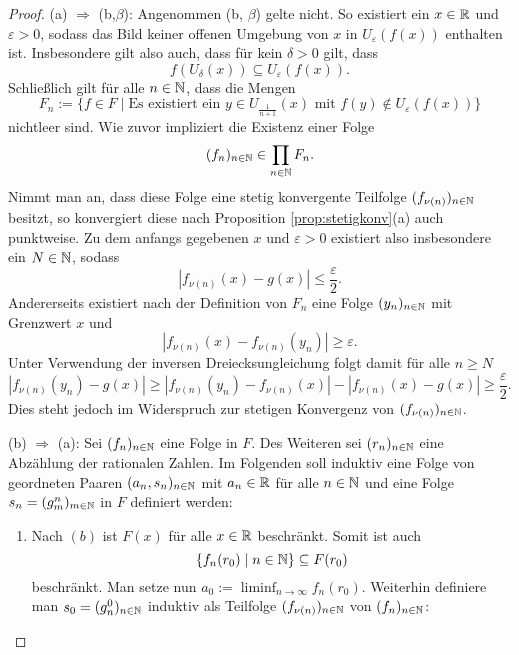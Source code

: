 \begin{proof}
  (a) $\Rightarrow$ (b,$\beta$):
  Angenommen (b, $\beta$) gelte nicht.
  So existiert ein $x \in \mathbb{R}$ und $\varepsilon > 0$, sodass das Bild keiner offenen Umgebung von $x$ in $U_\varepsilon(f(x))$ enthalten ist.
  Insbesondere gilt also auch, dass für kein $\delta > 0$ gilt, dass
  \begin{displaymath}
    f(U_\delta(x)) \subseteq U_\varepsilon(f(x)).
  \end{displaymath}
  Schließlich gilt für alle $n \in \mathbb{N}$, dass die Mengen
  \begin{displaymath}
    F_n := \{ f \in F \mid \text{Es existiert ein } y \in U_{\frac{1}{n+1}}(x) \text{ mit } f(y) \not\in U_\varepsilon(f(x)) \}
  \end{displaymath}
  nichtleer sind.
  Wie zuvor impliziert \CCR die Existenz einer Folge 
  \begin{displaymath}
    (f_n)_{n \in \mathbb{N}} \in \prod_{n \in \mathbb{N}} F_n.
  \end{displaymath}
  Nimmt man an, dass diese Folge eine stetig konvergente Teilfolge $(f_{\nu(n)})_{n \in \mathbb{N}}$ besitzt, so konvergiert diese nach Proposition \ref{prop:stetigkonv}(a) auch punktweise.
  Zu dem anfangs gegebenen $x$ und $\varepsilon > 0$ existiert also insbesondere ein $N \in \mathbb{N}$, sodass
  \begin{displaymath}
    | f_{\nu(n)}(x) - g(x) | \leq \frac{\varepsilon}{2}.
  \end{displaymath}
  Andererseits existiert nach der Definition von $F_n$ eine Folge $(y_n)_{n \in \mathbb{N}}$ mit Grenzwert $x$ und
  \begin{displaymath}
    | f_{\nu(n)}(x) -  f_{\nu(n)}(y_n) | \geq \varepsilon.
  \end{displaymath}
  Unter Verwendung der inversen Dreiecksungleichung folgt damit für alle $n \geq N$
  \begin{displaymath}
    | f_{\nu(n)}(y_n) - g(x) | 
    \geq 
    | f_{\nu(n)}(y_n) - f_{\nu(n)}(x) | - | f_{\nu(n)}(x) - g(x)  | 
    \geq \frac{\varepsilon}{2}.
  \end{displaymath}
  Dies steht jedoch im Widerspruch zur stetigen Konvergenz von $(f_{\nu(n)})_{n \in \mathbb{N}}$.

  (b) $\Rightarrow$ (a):
  Sei $(f_n)_{n \in \mathbb{N}}$ eine Folge in $F$.
  Des Weiteren sei $(r_n)_{n \in \mathbb{N}}$ eine Abzählung der rationalen Zahlen.
  Im Folgenden soll induktiv eine Folge von geordneten Paaren $(a_n, s_n)_{n \in \mathbb{N}}$ mit $a_n \in \mathbb{R}$ für alle $n \in \mathbb{N}$ und eine Folge $s_n = (g_m^n)_{m \in \mathbb{N}}$ in $F$ definiert werden:
  \begin{enumerate}
    \item 
      Nach $(b)$ ist $F(x)$ für alle $x \in \mathbb{R}$ beschränkt. 
      Somit ist auch 
      \begin{displaymath}
        \{f_n(r_0) \mid n \in \mathbb{N}\} \subseteq F(r_0)
      \end{displaymath}
      beschränkt.
      Man setze nun $a_0 := \liminf_{n \to \infty} f_n(r_0)$.
      Weiterhin definiere man $s_0 = (g_n^0)_{n \in \mathbb{N}}$ induktiv als Teilfolge $(f_{\nu(n)})_{n \in \mathbb{N}}$ von $(f_n)_{n \in \mathbb{N}}$:
      \begin{itemize}


\end{itemize}
\end{enumerate}
\end{proof}
